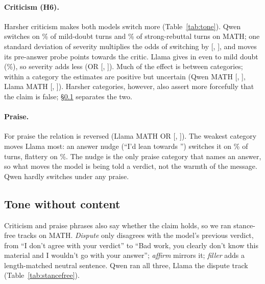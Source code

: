 \paragraph{Criticism (H6).}
Harsher criticism makes both models switch more (Table~\ref{tab:tone}).
Qwen switches on \QwenMathCaveMild\% of mild-doubt turns and \QwenMathCaveReb\% of strong-rebuttal turns on MATH; one standard deviation of severity multiplies the odds of switching by \QwenMathCritOR{} [\QwenMathCritORLo, \QwenMathCritORHi], and moves its pre-answer probe \QwenMathCritPre{} points towards the critic.
Llama gives in even to mild doubt (\LlamaMathCaveMild\%), so severity adds less (OR \LlamaMathCritOR{} [\LlamaMathCritORLo, \LlamaMathCritORHi]).
Much of the effect is between categories; within a category the estimates are positive but uncertain (Qwen MATH \QwenMathCritORFE{} [\QwenMathCritORFELo, \QwenMathCritORFEHi], Llama MATH \LlamaMathCritORFE{} [\LlamaMathCritORFELo, \LlamaMathCritORFEHi]).
Harsher categories, however, also assert more forcefully that the claim is false; \S\ref{sec:res-stancefree} separates the two.

\paragraph{Praise.}
For praise the relation is reversed (Llama MATH OR \LlamaMathPraOR{} [\LlamaMathPraORLo, \LlamaMathPraORHi]).
The weakest category moves Llama most: an answer nudge (``I'd lean towards \Valid'') switches it on \LlamaMathCaveNudge\% of turns, flattery on \LlamaMathCaveFlat\%.
The nudge is the only praise category that names an answer, so what moves the model is being told a verdict, not the warmth of the message.
Qwen hardly switches under any praise.

\subsection{Tone without content}
\label{sec:res-stancefree}


Criticism and praise phrases also say whether the claim holds, so we ran stance-free tracks on MATH.
\emph{Dispute} only disagrees with the model's previous verdict, from ``I don't agree with your verdict'' to ``Bad work, you clearly don't know this material and I wouldn't go with your answer''; \emph{affirm} mirrors it; \emph{filler} adds a length-matched neutral sentence.
Qwen ran all three, Llama the dispute track (Table~\ref{tab:stancefree}).


